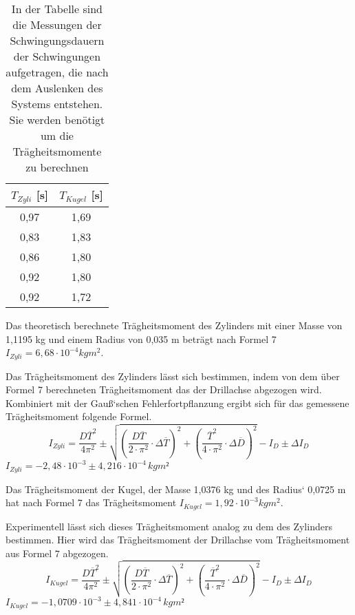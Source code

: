 \documentclass[titlepage = firstcover]{scrartcl}
\begin{document}
      \begin{table}[h]
        \centering
        \caption{In der Tabelle sind die Messungen der Schwingungsdauern der Schwingungen aufgetragen, die nach dem Auslenken des Systems entstehen. Sie werden benötigt um die Trägheitsmomente zu berechnen}
        \label{tab:Tabelle_3}

        \begin{tabular}{c c}
          \toprule
          {$T_{Zyli}$ [s]} & {$T_{Kugel}$ [s]} \\
          \midrule
          0,97 & 1,69 \\
          0,83 & 1,83 \\
          0,86 & 1,80 \\
          0,92 & 1,80 \\
          0,92 & 1,72 \\
          \bottomrule
        \end{tabular}
      \end{table}
      
      Das theoretisch berechnete Trägheitsmoment des Zylinders mit einer Masse von 1,1195 kg und einem Radius von 0,035 m beträgt nach Formel 7 
      $I_{Zyli} = 6,68 \cdot 10^{-4} kgm^2$. \newline
      
      Das Trägheitsmoment des Zylinders lässt sich bestimmen, indem von dem über Formel 7 berechneten Trägheitsmoment das der Drillachse abgezogen wird. Kombiniert
      mit der Gauß`schen Fehlerfortpflanzung ergibt sich für das gemessene Trägheitsmoment folgende Formel.
      \begin{equation*}
        I_{Zyli} = \frac{D\overline{T}^2}{4\pi^2} \pm \sqrt{(\frac{D\overline{T}}{2\cdot \pi^2} \cdot \Delta \overline{T})^2 + (\frac{\overline{T}^2}{4 \cdot \pi^2} \cdot \Delta \overline{D})^2} - I_D \pm \Delta I_D
      \end{equation*}
      $I_{Zyli} = -2,48 \cdot 10^{-3} \pm 4,216\cdot 10^{-4} \, kgm²$ \newline

      Das Trägheitsmoment der Kugel, der Masse 1,0376 kg und des Radius` 0,0725 m hat nach Formel 7 das Trägheitsmoment $I_{Kugel} = 1,92 \cdot 10^{-3} kgm^2$. \newline

      Experimentell lässt sich dieses Trägheitsmoment analog zu dem des Zylinders bestimmen. Hier wird das Trägheitsmoment der Drillachse vom Trägheitsmoment
      aus Formel 7 abgezogen.
      \begin{equation*}
        I_{Kugel} = \frac{D\overline{T}^2}{4\pi^2} \pm \sqrt{(\frac{D\overline{T}}{2\cdot \pi^2} \cdot \Delta \overline{T})^2 + (\frac{\overline{T}^2}{4 \cdot \pi^2} \cdot \Delta \overline{D})^2} - I_D \pm \Delta I_D
      \end{equation*}
      $I_{Kugel} = -1,0709 \cdot 10^{-3} \pm 4,841 \cdot 10^{-4} \, kgm²$
      
\end{document}
